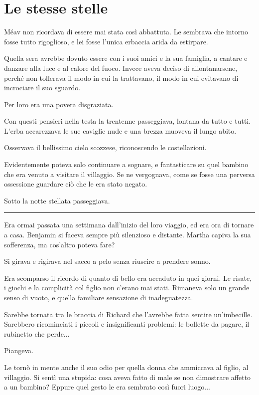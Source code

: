 \chapter{Le stesse stelle}
\label{ch:le-stesse-stelle}

Méav non ricordava di essere mai stata così abbattuta. Le sembrava che intorno fosse tutto
rigoglioso, e lei fosse l'unica erbaccia arida da estirpare.

Quella sera avrebbe dovuto essere con i suoi amici e la sua famiglia, a cantare e danzare alla luce
e al calore del fuoco. Invece aveva deciso di allontanarsene, perché non tollerava il modo in cui la
trattavano, il modo in cui evitavano di incrociare il suo sguardo.

Per loro era una povera disgraziata.

Con questi pensieri nella testa la trentenne passeggiava, lontana da tutto e tutti. L'erba
accarezzava le sue caviglie nude e una brezza muoveva il lungo abito.

Osservava il bellissimo cielo scozzese, riconoscendo le costellazioni.

Evidentemente poteva solo continuare a sognare, e fantasticare su quel bambino che era venuto a
visitare il villaggio. Se ne vergognava, come se fosse una perversa ossessione guardare ciò che le
era stato negato.

Sotto la notte stellata passeggiava.

\plainbreak{1}

Era ormai passata una settimana dall'inizio del loro viaggio, ed era ora di tornare a casa. Benjamin
si faceva sempre più silenzioso e distante. Martha capiva la sua sofferenza, ma cos'altro poteva
fare?

Si girava e rigirava nel sacco a pelo senza riuscire a prendere sonno.

Era scomparso il ricordo di quanto di bello era accaduto in quei giorni. Le risate, i giochi e la
complicità col figlio non c'erano mai stati. Rimaneva solo un grande senso di vuoto, e quella
familiare sensazione di inadeguatezza.

Sarebbe tornata tra le braccia di Richard che l'avrebbe fatta sentire un'imbecille. Sarebbero
ricominciati i piccoli e insignificanti problemi: le bollette da pagare, il rubinetto che perde...

Piangeva.

Le tornò in mente anche il suo odio per quella donna che ammiccava al figlio, al villaggio. Si sentì
una stupida: cosa aveva fatto di male se non dimostrare affetto a un bambino? Eppure quel gesto le
era sembrato così fuori luogo...

